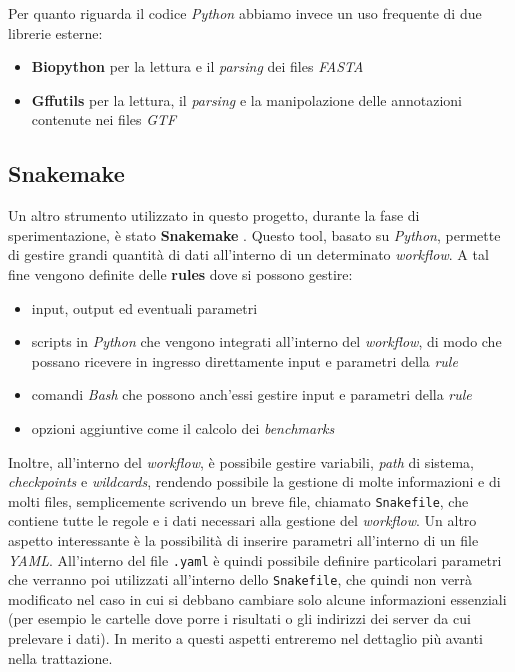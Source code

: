 \documentclass[a4paper,12pt, oneside]{book}
\begin{document}
Per quanto riguarda il codice \textit{Python} abbiamo invece un uso frequente
di due librerie esterne:
\begin{itemize}
  \item \textbf{Biopython} \cite{biopython} per la lettura e il
  \textit{parsing} dei files \textit{FASTA}
  \item \textbf{Gffutils} \cite{gffutils} per la lettura, il
  \textit{parsing} e la manipolazione delle annotazioni contenute nei files
  \textit{GTF} 
\end{itemize}
\subsection{Snakemake}
Un altro strumento utilizzato in questo progetto, durante la fase di
sperimentazione, è stato
\textbf{Snakemake} \cite{10.1093/bioinformatics/bts480}. Questo tool, basato su
\textit{Python}, permette di gestire grandi quantità di dati all'interno di un 
determinato \textit{workflow}. A tal fine vengono definite delle \textbf{rules}
dove si possono gestire:
\begin{itemize}
  \item input, output ed eventuali parametri
  \item scripts in \textit{Python} che vengono integrati all'interno del
  \textit{workflow}, di modo che possano ricevere in ingresso direttamente
  input e parametri della \textit{rule} 
  \item comandi \textit{Bash} che possono anch'essi gestire input e parametri
  della \textit{rule}
  \item opzioni aggiuntive come il calcolo dei \textit{benchmarks}
\end{itemize}
Inoltre, all'interno del \textit{workflow}, è possibile gestire variabili,
\textit{path} di sistema, \textit{checkpoints} e \textit{wildcards}, rendendo
possibile la gestione di molte informazioni e di molti files, semplicemente
scrivendo un breve file, chiamato \texttt{Snakefile}, che contiene tutte le
regole e i dati necessari alla gestione del \textit{workflow}. Un altro aspetto
interessante è la possibilità di inserire parametri all'interno di un file
\textit{YAML}. All'interno del file \texttt{.yaml} è quindi possibile definire
particolari parametri che verranno poi utilizzati all'interno dello
\texttt{Snakefile}, che quindi non verrà modificato nel caso in cui si debbano
cambiare solo alcune informazioni essenziali (per esempio le cartelle dove porre
i risultati o gli indirizzi dei server da cui prelevare i dati). In merito a
questi aspetti entreremo nel dettaglio più avanti nella trattazione.
\end{document}

